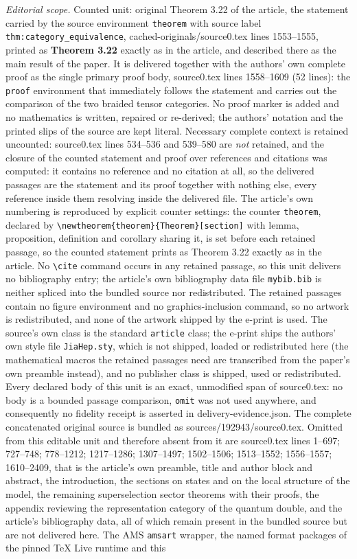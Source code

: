 \documentclass[10pt,a4paper]{amsart}
\theoremstyle{definition}
\theoremstyle{remark}
\theoremstyle{remark}
\begin{document}
\noindent\textit{Editorial scope.} Counted unit: original Theorem 3.22 of the article, the statement carried by the source environment \texttt{theorem} with source label \texttt{thm:category\_equivalence}, cached-originals/source0.tex lines 1553--1555, printed as \textbf{Theorem 3.22} exactly as in the article, and described there as the main result of the paper. It is delivered together with the authors' own complete proof as the single primary proof body, source0.tex lines 1558--1609 (52 lines): the \texttt{proof} environment that immediately follows the statement and carries out the comparison of the two braided tensor categories. No proof marker is added and no mathematics is written, repaired or re-derived; the authors' notation and the printed slips of the source are kept literal. Necessary complete context is retained uncounted: source0.tex lines 534--536 and 539--580 are \emph{not} retained, and the closure of the counted statement and proof over references and citations was computed: it contains no reference and no citation at all, so the delivered passages are the statement and its proof together with nothing else, every reference inside them resolving inside the delivered file. The article's own numbering is reproduced by explicit counter settings: the counter \texttt{theorem}, declared by \texttt{\textbackslash newtheorem\{theorem\}\{Theorem\}[section]} with lemma, proposition, definition and corollary sharing it, is set before each retained passage, so the counted statement prints as Theorem 3.22 exactly as in the article. No \texttt{\textbackslash cite} command occurs in any retained passage, so this unit delivers no bibliography entry; the article's own bibliography data file \texttt{mybib.bib} is neither spliced into the bundled source nor redistributed. The retained passages contain no figure environment and no graphics-inclusion command, so no artwork is redistributed, and none of the artwork shipped by the e-print is used. The source's own class is the standard \texttt{article} class; the e-print ships the authors' own style file \texttt{JiaHep.sty}, which is not shipped, loaded or redistributed here (the mathematical macros the retained passages need are transcribed from the paper's own preamble instead), and no publisher class is shipped, used or redistributed. Every declared body of this unit is an exact, unmodified span of source0.tex: no body is a bounded passage comparison, \texttt{omit} was not used anywhere, and consequently no fidelity receipt is asserted in delivery-evidence.json. The complete concatenated original source is bundled as sources/192943/source0.tex. Omitted from this editable unit and therefore absent from it are source0.tex lines 1--697; 727--748; 778--1212; 1217--1286; 1307--1497; 1502--1506; 1513--1552; 1556--1557; 1610--2409, that is the article's own preamble, title and author block and abstract, the introduction, the sections on states and on the local structure of the model, the remaining superselection sector theorems with their proofs, the appendix reviewing the representation category of the quantum double, and the article's bibliography data, all of which remain present in the bundled source but are not delivered here. The AMS \texttt{amsart} wrapper, the named format packages of the pinned TeX Live runtime and this 
\end{document}
